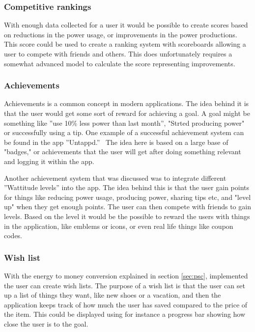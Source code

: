\subsubsection{Competitive rankings}
With enough data collected for a user it would be possible to create scores based on reductions in the power usage, or improvements in the power productions. This score could be used to create a ranking system with scoreboards allowing a user to compete with friends and others. This does unfortunately requires a somewhat advanced model to calculate the score representing improvements.

\subsubsection{Achievements}
Achievements is a common concept in modern applications. The idea behind it is that the user would get some sort of reward for achieving a goal. A goal might be something like ''use 10\% less power than last month'', "Strted producing power" or successfully using a tip.
One example of a successful achievement system can be found in the app ''Untappd.''~\cite{untappd}
The idea here is based on a large base of "badges," or achievements that the user will get after doing something relevant and logging it within the app. 

Another achievement system that was discussed was to integrate different ''Wattitude levels'' into the app. The idea behind this is that the user gain points for things like reducing power usage, producing power, sharing tips etc, and "level up" when they get enough points. The user can then compete with friends to gain levels. Based on the level it would be the possible to reward the users with things in the application, like emblems or icons, or even real life things like coupon codes.


\subsubsection{Wish list}
With the energy to money conversion explained in section \ref{sec:psc}, implemented the user can create wish lists. 
The purpose of a wish list is that the user can set up a list of things they want, like new shoes or a vacation, and then the application keeps track of how much the user has saved compared to the price of the item. This could be displayed using for instance a progress bar showing how close the user is to the goal.


